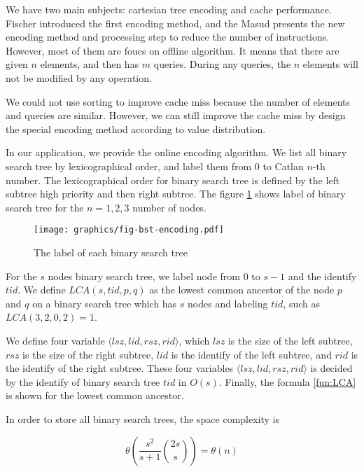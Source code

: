 We have two main subjects: cartesian tree encoding and cache
performance.  Fischer introduced the first encoding method, and the
Masud presents the new encoding method and processing step to reduce
the number of instructions.  However, most of them are foucs on
offline algorithm.  It means that there are given $n$ elements, and
then has $m$ queries.  During any queries, the $n$ elements will not
be modified by any operation.

We could not use sorting to improve cache miss because the number of
elements and queries are similar.  However, we can still improve the
cache miss by design the special encoding method according to value
distribution.

In our application, we provide the online encoding algorithm.  We list
all binary search tree by lexicographical order, and label them from
$0$ to Catlan $n$-th number.  The lexicographical order for binary
search tree is defined by the left subtree high priority and then
right subtree.  The figure \ref{fig:labelingBST} shows label of binary
search tree for the $n=1,2,3$ number of nodes.

\begin{figure}[!thb]
  \centering
  \texttt{[image: graphics/fig-bst-encoding.pdf]}
  \caption{The label of each binary search tree}
  \label{fig:labelingBST}
\end{figure}

For the $s$ nodes binary search tree, we label node from $0$ to $s-1$
and the identify $\mathit{tid}$.  We define $\mathit{LCA}(s,
\mathit{tid}, p, q)$ as the lowest common ancestor of the node $p$ and
$q$ on a binary search tree which has $s$ nodes and labeling
$\mathit{tid}$, such as $\mathit{LCA}(3, 2, 0, 2) = 1$.

We define four variable
$\langle\mathit{lsz},\mathit{lid},\mathit{rsz},\mathit{rid}\rangle$,
which $\mathit{lsz}$ is the size of the left subtree, $\mathit{rsz}$
is the size of the right subtree, $\mathit{lid}$ is the identify of
the left subtree, and $\mathit{rid}$ is the identify of the right
subtree.  These four variables
$\langle\mathit{lsz},\mathit{lid},\mathit{rsz},\mathit{rid}\rangle$ is
decided by the identify of binary search tree $\mathit{tid}$ in
$O(s)$.  Finally, the formula \ref{fun:LCA} is shown for the lowest
common ancestor.

In order to store all binary search trees, the space complexity is 

\begin{equation}
\theta\left(\frac{s^2}{s+1} \binom{2s}{s}\right) = \theta\left(n\right)
\end{equation}

